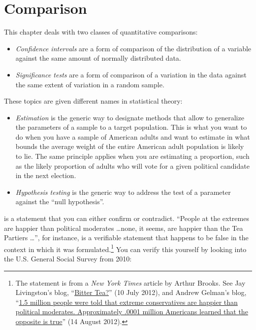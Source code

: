 \chapter{Comparison}%
	\label{ch:comparison}%

This chapter deals with two classes of quantitative comparisons:

\begin{itemize}
  \item \emph{Confidence intervals} are a form of comparison of the distribution of a variable against the same amount of normally distributed data. %
  \item \emph{Significance tests} are a form of comparison of a variation in the data against the same extent of variation in a random sample. %
\end{itemize}

These topics are given different names in statistical theory:

\begin{itemize}
  \item \emph{Estimation} is the generic way to designate methods that allow to generalize the parameters of a sample to a target population. This is what you want to do when you have a sample of American adults and want to estimate in what bounds the average weight of the entire American adult population is likely to lie. The same principle applies when you are estimating a proportion, such as the likely proportion of adults who will vote for a given political candidate in the next election. %
  \item \emph{Hypothesis testing} is the generic way to address the test of a parameter against the ``null hypothesis''.
\end{itemize}

 is a statement that you can either confirm or contradict. ``People at the extremes are happier than political moderates \dots none, it seems, are happier than the Tea Partiers \dots'', for instance, is a verifiable statement that happens to be false in the context in which it was formulated.\footnote{The statement is from a \emph{New York Times} article by Arthur Brooks. See Jay Livingston's blog, ``\href{http://montclairsoci.blogspot.ch/2012/07/bitter-tea.html}{Bitter Tea?}'' (10 July 2012), and Andrew Gelman's blog, ``\href{http://andrewgelman.com/2012/08/1-5-million-people-were-told-that-extreme-conservatives-are-happier-than-political-moderates-approximately-0001-million-americans-learned-that-the-opposite-is-true/}{1.5 million people were told that extreme conservatives are happier than political moderates. Approximately .0001 million Americans learned that the opposite is true}'' (14 August 2012).} You can verify this yourself by looking into the U.S. General Social Survey from 2010:%

